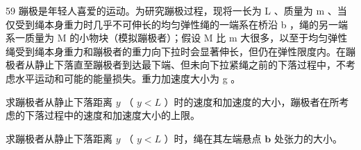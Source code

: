 \begin{problem}[33届物理竞赛复赛]{59}
    蹦极是年轻人喜爱的运动。为研究蹦极过程，现将一长为 L 、质量为 m 、当仅受到绳本身重力时几乎不可伸长的均匀弹性绳的一端系在桥沿 b ，绳的另一端系一质量为 M 的小物块（模拟蹦极者）；假设 M 比 m 大很多，以至于均匀弹性绳受到绳本身重力和蹦极者的重力向下拉时会显著伸长，但仍在弹性限度内。在蹦极者从静止下落直至蹦极者到达最下端、但未向下拉紧绳之前的下落过程中，不考虑水平运动和可能的能量损失。重力加速度大小为 g 。

    \begin{subproblem}
        求蹦极者从静止下落距离 $y$ （ $y < L$ ）时的速度和加速度的大小，蹦极者在所考虑的下落过程中的速度和加速度大小的上限。
    \end{subproblem}
    \begin{subproblem}
        求蹦极者从静止下落距离 $y$ （ $y < L$ ）时，绳在其左端悬点 $\mathbf{b}$ 处张力的大小。
    \end{subproblem}
\end{problem}